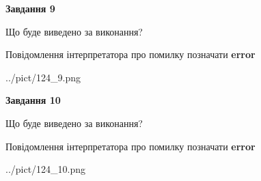\documentclass[12pt, ukrainian]{article}
\begin{document}
{{\begin {center}\textbf{Завдання 9}\end {center}}\par
Що буде виведено за виконання? \par
Повідомлення інтерпретатора про помилку позначати \textbf{error}

\begin{center}
	{../pict/124_9.png}
\end{center}
\newpage

{\begin {center}\textbf{Завдання 10}\end {center}}\par
Що буде виведено за виконання? \par
Повідомлення інтерпретатора про помилку позначати \textbf{error}

\begin{center}
	{../pict/124_10.png}
\end{center}
\newpage

}
\end{document}
